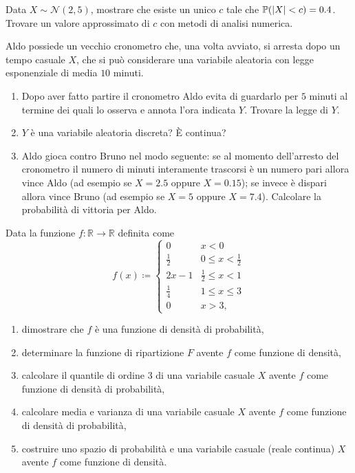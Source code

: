 Data $X\sim \mathcal{N}(2,5)$, mostrare che esiste un unico $c$ tale che $\mathbb{P}(| X| < c) =0.4$. Trovare un valore approssimato di $c$ con metodi di analisi numerica.
\Esercizio{}

Aldo possiede un vecchio cronometro che, una volta avviato, si arresta dopo un tempo casuale $X$, che si può considerare una variabile aleatoria con legge esponenziale di media $10$ minuti.
\begin{enumerate}
\item Dopo aver fatto partire il cronometro Aldo evita di guardarlo per $5$ minuti al termine dei quali lo osserva e annota l'ora indicata $Y$. Trovare la legge di $Y$.
\item $Y$ è una variabile aleatoria discreta? È continua?
\item Aldo gioca contro Bruno nel modo seguente: se al momento dell'arresto del cronometro il numero di minuti interamente trascorsi è un numero pari allora vince Aldo (ad esempio se $X=2.5$ oppure $X=0.15$); se invece è dispari allora vince Bruno (ad esempio se $X=5$ oppure $X=7.4$). Calcolare la probabilità di vittoria per Aldo.
\end{enumerate}
\Esercizio{}

Data la funzione $f:\mathbb{R}\rightarrow \mathbb{R}$ definita come
\begin{equation*}
f(x) \coloneqq \begin{cases}
0 & x< 0\\
\frac{1}{2} & 0\leq x< \frac{1}{2}\\
2x-1 & \frac{1}{2} \leq x< 1\\
\frac{1}{4} & 1\leq x\leq 3\\
0 & x >3,
\end{cases}
\end{equation*}
\begin{enumerate}
\item dimostrare che $f$ è una funzione di densità di probabilità,
\item determinare la funzione di ripartizione $F$ avente $f$ come funzione di densità,
\item calcolare il quantile di ordine $3$ di una variabile casuale $X$ avente $f$ come funzione di densità di probabilità,
\item calcolare media e varianza di una variabile casuale $X$ avente $f$ come funzione di densità di probabilità,
\item costruire uno spazio di probabilità e una variabile casuale (reale continua) $X$ avente $f$ come funzione di densità.
\end{enumerate}


\ParteSoluzioni
